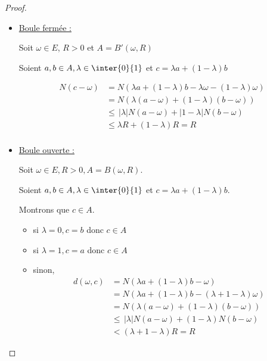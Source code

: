 
\begin{proof}~

    \begin{itemize}
        \item \uline{Boule fermée :}

        Soit $\omega \in E$, $R > 0$ et $A = B'( \omega, R)$
    
        Soient $a, b \in A, \lambda \in \inter{0}{1}$ et $c = \lambda a + (1 - \lambda)b$

        \begin{align*}
            N(c - \omega) & = N(\lambda a + (1 - \lambda)b - \lambda \omega - (1 - \lambda) \omega) \\
            & = N(\lambda(a - \omega) + (1 - \lambda)(b - \omega)) \\
            & \leqslant \, |\lambda| N(a - \omega) + |1 - \lambda| N(b - \omega) \\
            & \leqslant \lambda R + (1 - \lambda)R = R \\
        \end{align*}

        \item \underline{Boule ouverte :}

        Soit $\omega  \in E, R > 0, A = B(\omega, R)$. 

        Soient $a, b \in A, \lambda \in \inter{0}{1}$ et $c = \lambda a + (1 - \lambda)b$.

        Montrons que $c \in A$. 
        \begin{itemize}
            \item si $\lambda = 0, c = b$ donc $c \in A$
            \item si $\lambda = 1, c = a$ donc $c \in A$
            \item sinon, 
                \begin{align*}
                    d(\omega, c) & = N(\lambda a + (1 - \lambda) b - \omega) \\
                    & = N(\lambda a + (1 - \lambda) b - (\lambda + 1- \lambda) \omega) \\
                    & = N(\lambda(a - \omega) + (1 - \lambda) (b - \omega)) \\
                    & \leqslant \, |\lambda| N(a - \omega) + (1 - \lambda)N(b - \omega) \\
                    & < (\lambda + 1 - \lambda) R = R
                \end{align*}
        \end{itemize}
    \end{itemize}
\end{proof}

